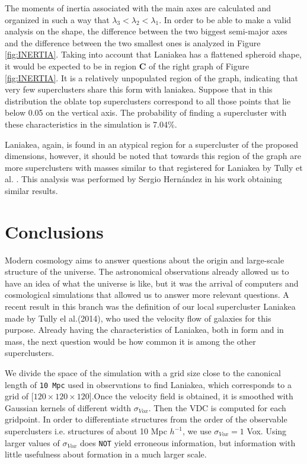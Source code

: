 \documentclass[a4paper,fleqn,usenatbib]{mnras}
\begin{document}
The moments of inertia associated with the main axes are calculated and organized in such a way that $ \lambda_3 < \lambda_2 < \lambda_1 $. In order to be able to make a valid analysis on the shape, the difference between the two biggest semi-major axes and the difference between the two smallest ones is analyzed in Figure \ref{fig:INERTIA}. Taking into account that Laniakea has a flattened spheroid shape, it would be expected to be in region \textbf{C} of the right graph of Figure \ref{fig:INERTIA}. It is a relatively unpopulated region of the graph, indicating that very few superclusters share this form with laniakea. Suppose that in this distribution the oblate top superclusters correspond to all those points that lie below 0.05 on the vertical axis. The probability of finding a supercluster with these characteristics in the simulation is 7.04\%.

Laniakea, again, is found in an atypical region for a supercluster of the proposed dimensions, however, it should be noted that towards this region of the graph are more superclusters with masses similar to that registered for Laniakea by Tully et  al. \cite{tully_laniakea_2014}. This analysis was performed by Sergio Hernández in his work\cite{SHC_TESIS} obtaining similar results.










\section{Conclusions}
\label{sec:conclusions}
Modern cosmology aims to answer questions about the origin and large-scale structure of the universe. The astronomical observations already allowed us to have an idea of what the universe is like, but it was the arrival of computers and cosmological simulations that allowed us to answer more relevant questions.
A recent result in this branch was the definition of our local supercluster Laniakea made by Tully el al.(2014)\cite{tully_laniakea_2014}, who used the velocity flow of galaxies for this purpose. Already having the characteristics of Laniakea, both in form and in mass, the next question would be how common it is among the other superclusters.

We divide the space of the simulation with a grid size close to the canonical length of \texttt{10 Mpc} used in observations to find Laniakea, which corresponds to a grid of [$120 \times 120 \times 120$].Once the velocity field is obtained, it is smoothed with Gaussian kernels of different width $\sigma_{Vox}$. Then the VDC is computed for each gridpoint. In order to differentiate structures from the order of the observable superclusters i.e. structures of about 10 Mpc $h^{-1}$, we use $\sigma_{Vox} = 1$ Vox. Using larger values of $\sigma_{Vox}$ does \texttt{NOT} yield erroneous information, but information with little usefulness about formation in a much larger scale.  
\end{document}

